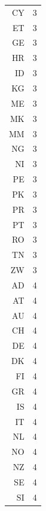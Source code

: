 \documentclass{article}[hidelinks]
\begin{document}
\begin{table}[ht]
\begin{tabular}{rr}
  CY &   3 \\ 
  ET &   3 \\ 
 GE &   3 \\ 
  HR &   3 \\ 
  ID &   3 \\ 
  KG &   3 \\ 
  ME &   3 \\ 
  MK &   3 \\ 
  MM &   3 \\ 
  NG &   3 \\ 
  NI &   3 \\ 
  PE &   3 \\ 
  PK &   3 \\ 
  PR &   3 \\ 
  PT &   3 \\ 
  RO &   3 \\ 
  TN &   3 \\ 
  ZW &   3 \\ 
  AD &   4 \\ 
  AT &   4 \\ 
  AU &   4 \\ 
  CH &   4 \\ 
  DE &   4 \\ 
  DK &   4 \\ 
  FI &   4 \\ 
  GR &   4 \\ 
  IS &   4 \\ 
  IT &   4 \\ 
  NL &   4 \\ 
  NO &   4 \\ 
  NZ &   4 \\ 
  SE &   4 \\ 
  SI &   4 \\ 
   \hline
\end{tabular}
\label{tab:clusters_Assigned}
\end{table}
\end{document}
